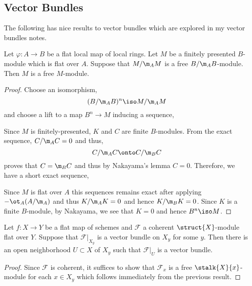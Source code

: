 \documentclass[12pt]{article}
\renewcommand{\F}{\mathcal{F}}
\begin{document}
\subsection{Vector Bundles}

\begin{rmk}
The following has nice results to vector bundles which are explored in my vector bundles notes.
\end{rmk}

\begin{prop}
Let $\varphi : A \to B$ be a flat local map of local rings. Let $M$ be a finitely presented $B$-module which is flat over $A$. Suppose that $M / \m_A M$ is a free $B / \m_A B$-module. Then $M$ is a free $M$-module. 
\end{prop}

\begin{proof}
Choose an isomorphism,
\[ (B / \m_A B)^n \iso M / \m_A M \]
and choose a lift to a map $B^n \to M$ inducing a sequence,
\begin{center}
\end{center}
Since $M$ is finitely-presented, $K$ and $C$ are finite $B$-modules. From the exact sequence, $C / \m_A C = 0$ and thus,
\[ C / \m_A C \onto C / \m_B C \]
proves that $C = \m_B C$ and thus by Nakayama's lemma $C = 0$. Therefore, we have a short exact sequence,
\begin{center}
\end{center}
Since $M$ is flat over $A$ this sequences remains exact after applying $- \ot_A (A/\m_A)$ and thus $K / \m_A K = 0$ and hence $K / \m_B K = 0$. Since $K$ is a finite $B$-module, by Nakayama, we see that $K = 0$ and hence $B^n \iso M$. 
\end{proof}

\begin{cor}
Let $f : X \to Y$ be a flat map of schemes and $\F$ a coherent $\struct{X}$-module flat over $Y$. Suppose that $\F|_{X_y}$ is a vector bundle on $X_y$ for some $y$. Then there is an open neighborhood $U \subset X$ of $X_y$ such that $\F|_U$ is a vector bundle.
\end{cor}

\begin{proof}
Since $\F$ is coherent, it suffices to show that $\F_x$ is a free $\stalk{X}{x}$-module for each $x \in X_y$ which follows immediately from the previous result.
\end{proof}
\end{document}
